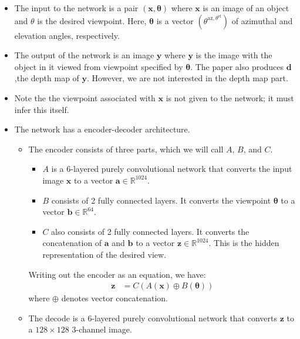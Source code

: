\documentclass[10pt]{article}
\newcommand{\ve}[1]{\pmb{#1}}
\newcommand{\mrm}[1]{\mathrm{#1}}
\newcommand{\Real}{\mathbb{R}}
\begin{document}
  \begin{itemize}
  	\item The input to the network is a pair $(\ve{x}, \ve{\theta})$ where $\ve{x}$ is an image of an object and $\theta$ is the desired viewpoint. Here, $\ve{\theta}$ is a vector $(\theta^{\mrm{az}, \theta^{\mrm{el}}})$ of azimuthal and elevation angles, respectively.

  	\item The output of the network is an image $\ve{y}$ where $\ve{y}$ is the image with the object in it viewed from viewpoint specified by $\ve{\theta}$. The paper also produces $\ve{d}$,the depth map of $\ve{y}$. However, we are not interested in the depth map part.

  	\item Note the the viewpoint associated with $\ve{x}$ is not given to the network; it must infer this itself.

  	\item The network has a encoder-decoder architecture.
  	\begin{itemize}
  		\item The encoder consists of three parts, which we will call $A$, $B$, and $C$.
  		\begin{itemize}
  			\item $A$ is a 6-layered purely convolutional network that converts the input image $\ve{x}$ to a vector $\ve{a} \in \Real^{1024}$.

  			\item $B$ consists of 2 fully connected layers. It converts the viewpoint $\ve{\theta}$ to a vector $\ve{b} \in \Real^{64}$.

  			\item $C$ also consists of 2 fully connected layers. It converts the concatenation of $\ve{a}$ and $\ve{b}$ to a vector $\ve{z} \in \Real^{1024}$. This is the hidden representation of the desired view.  		
  		\end{itemize}
  		Writing out the encoder as an equation, we have:
  		\begin{align*}
  			\ve{z} &= C(A(\ve{x}) \oplus B(\ve{\theta}))
  		\end{align*}
  		where $\oplus$ denotes vector concatenation.

  		\item The decode is a $6$-layered purely convolutional network that converts $\ve{z}$ to a $128 \times 128$ $3$-channel image.
  	\end{itemize}


\end{itemize}
\end{document}
